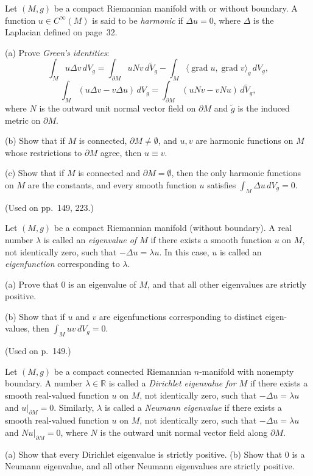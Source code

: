 \begin{exercise}\label{prob:harmonic-functions}
Let $(M,g)$ be a compact Riemannian manifold with or without boundary.
A function $u \in C^\infty(M)$ is said to be \emph{harmonic} if $\Delta u = 0$, where $\Delta$ is the
Laplacian defined on page~32.

(a) Prove \emph{Green's identities}:
\[
\int_M u\Delta v \, dV_g = \int_{\partial M} u N v \, d\tilde{V}_g - \int_M \langle \operatorname{grad} u, \operatorname{grad} v \rangle_g \, dV_g,
\]
\[
\int_M (u\Delta v - v\Delta u) \, dV_g = \int_{\partial M} (u N v - v N u) \, d\tilde{V}_g,
\]
where $N$ is the outward unit normal vector field on $\partial M$ and $\tilde{g}$ is the
induced metric on $\partial M$.

(b) Show that if $M$ is connected, $\partial M \ne \emptyset$, and $u, v$ are harmonic functions
on $M$ whose restrictions to $\partial M$ agree, then $u \equiv v$.

(c) Show that if $M$ is connected and $\partial M = \emptyset$, then the only harmonic
functions on $M$ are the constants, and every smooth function $u$ satisfies
$\int_M \Delta u \, dV_g = 0$.

(Used on pp.\ 149, 223.)
\end{exercise}

\begin{exercise}\label{prob:eigenvalues}
Let $(M,g)$ be a compact Riemannian manifold (without boundary). A real
number $\lambda$ is called an \emph{eigenvalue of $M$} if there exists a smooth function $u$
on $M$, not identically zero, such that $-\Delta u = \lambda u$. In this case, $u$ is called an
\emph{eigenfunction} corresponding to $\lambda$.

(a) Prove that $0$ is an eigenvalue of $M$, and that all other eigenvalues are
strictly positive.

(b) Show that if $u$ and $v$ are eigenfunctions corresponding to distinct eigen-
values, then $\int_M uv \, dV_g = 0$.

(Used on p.\ 149.)
\end{exercise}

\begin{exercise}\label{prob:dirichlet-neumann-eigenvalues}
Let $(M,g)$ be a compact connected Riemannian $n$-manifold with nonempty
boundary. A number $\lambda \in \mathbb{R}$ is called a \emph{Dirichlet eigenvalue for $M$} if there
exists a smooth real-valued function $u$ on $M$, not identically zero, such that
$-\Delta u = \lambda u$ and $u|_{\partial M} = 0$. Similarly, $\lambda$ is called a \emph{Neumann eigenvalue} if there exists a smooth real-valued function $u$ on $M$, not identically zero, such that $-\Delta u = \lambda u$ and $Nu|_{\partial M} = 0$, where $N$ is the outward unit normal vector field along $\partial M$.

(a) Show that every Dirichlet eigenvalue is strictly positive.
(b) Show that 0 is a Neumann eigenvalue, and all other Neumann eigenvalues are strictly positive.
\end{exercise}

